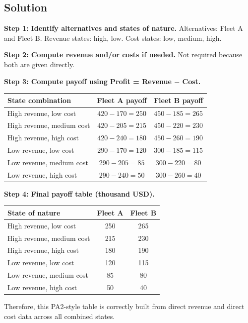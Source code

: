 \begin{ExamProblems}
		\subsection*{Solution}
		\textbf{Step 1: Identify alternatives and states of nature.} Alternatives: Fleet A and Fleet B. Revenue states: high, low. Cost states: low, medium, high.
		
		\textbf{Step 2: Compute revenue and/or costs if needed.} Not required because both are given directly.
		
		\textbf{Step 3: Compute payoff using Profit = Revenue $-$ Cost.}
		\begin{center}
			\begin{tabular}{l c c}
				\toprule
				State combination & Fleet A payoff & Fleet B payoff \\
				\midrule
				High revenue, low cost & $420-170=250$ & $450-185=265$ \\
				High revenue, medium cost & $420-205=215$ & $450-220=230$ \\
				High revenue, high cost & $420-240=180$ & $450-260=190$ \\
				Low revenue, low cost & $290-170=120$ & $300-185=115$ \\
				Low revenue, medium cost & $290-205=85$ & $300-220=80$ \\
				Low revenue, high cost & $290-240=50$ & $300-260=40$ \\
				\bottomrule
			\end{tabular}
		\end{center}
		
		\textbf{Step 4: Final payoff table (thousand USD).}
		\begin{center}
			\begin{tabular}{l c c}
				\toprule
				State of nature & Fleet A & Fleet B \\
				\midrule
				High revenue, low cost & 250 & 265 \\
				High revenue, medium cost & 215 & 230 \\
				High revenue, high cost & 180 & 190 \\
				Low revenue, low cost & 120 & 115 \\
				Low revenue, medium cost & 85 & 80 \\
				Low revenue, high cost & 50 & 40 \\
				\bottomrule
			\end{tabular}
		\end{center}
		
		Therefore, this PA2-style table is correctly built from direct revenue and direct cost data across all combined states.
		

\end{ExamProblems}
